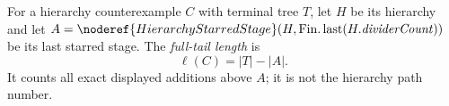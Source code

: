 \begin{definition}
For a hierarchy counterexample \(C\) with terminal tree \(T\), let \(H\) be
its hierarchy and let
\(A=\noderef{HierarchyStarredStage}(H,\operatorname{Fin.last}
(H.\mathit{dividerCount}))\) be its last starred stage.  The
\emph{full-tail length} is
\[
  \ell(C)=|T|-|A|.
\]
It counts all exact displayed additions above \(A\); it is not the hierarchy
path number.
\end{definition}
